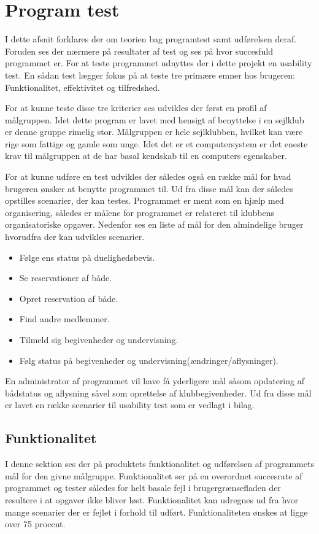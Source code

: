 \chapter{Program test}
I dette afsnit forklares der om teorien bag programtest samt udførelsen deraf. Foruden ses der nærmere på resultater af test og ses på hvor succesfuld programmet er. For at teste programmet udnyttes der i dette projekt en usability test. En sådan test lægger fokus på at teste tre primære emner hos brugeren: Funktionalitet, effektivitet og tilfredshed. 

For at kunne teste disse tre kriterier ses udvikles der først en profil af målgruppen. Idet dette program er lavet med hensigt af benyttelse i en sejlklub er denne gruppe rimelig stor. Målgruppen er hele sejlklubben, hvilket kan være rige som fattige og gamle som unge. Idet det er et computersystem er det eneste krav til målgruppen at de har basal kendskab til en computers egenskaber.

For at kunne udføre en test udvikles der således også en række mål for hvad brugeren ønsker at benytte programmet til. Ud fra disse mål kan der således opstilles scenarier, der kan testes. Programmet er ment som en hjælp med organisering, således er målene for programmet er relateret til klubbens organisatoriske opgaver. Nedenfor ses en liste af mål for den almindelige bruger hvorudfra der kan udvikles scenarier.
\begin{itemize}
  \item Følge ens status på duelighedsbevis.
  \item Se reservationer af både.
  \item Opret reservation af  både.
  \item Find andre medlemmer.
  \item Tilmeld sig begivenheder og undervisning.
  \item Følg status på begivenheder og undervisning(ændringer/aflysninger).
\end{itemize}
En administrator af programmet vil have få yderligere mål såsom opdatering af bådstatus og aflysning såvel som oprettelse af klubbegivenheder. Ud fra disse mål er lavet en række scenarier til usability test som er vedlagt i bilag. 
\section{Funktionalitet}
I denne sektion ses der på produktets funktionalitet og udførelsen af programmets mål for den givne målgruppe. Funktionalitet ser på en overordnet succesrate af programmet og tester således for helt basale fejl i brugergrænsefladen der resultere i at opgaver ikke bliver løst. Funktionalitet kan udregnes ud fra hvor mange scenarier der er fejlet i forhold til udført. Funktionaliteten ønskes at ligge over 75 procent. 

